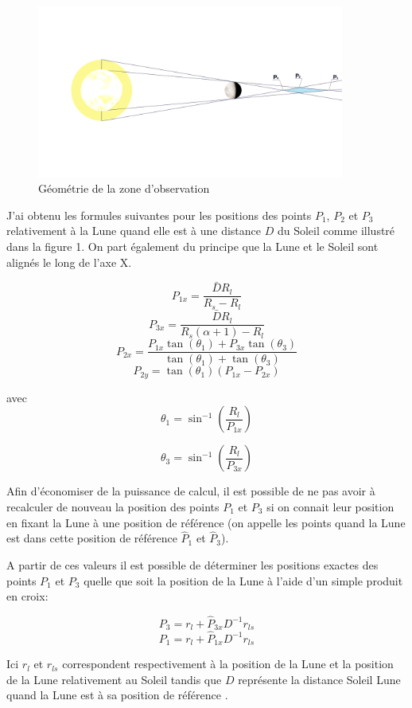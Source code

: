 \documentclass[11pt]{article} %
\begin{document}
		\begin{figure}[H]
			\includegraphics[width=0.9\textwidth]{images/moon_schem.png}
			\caption{Géométrie de la zone d'observation}
		\end{figure}
		
		J'ai obtenu les formules suivantes pour les positions des points $P_1$, $P_2$ et $P_3$ relativement à la Lune quand elle est à une distance $D$ du Soleil comme illustré dans la figure 1. On part également du principe que la Lune et le Soleil sont alignés le long de l'axe X.
		
		$$	
		P_{1x}=\frac{\bar{D}R_l}{R_s-R_l}
		$$ 
		$$	
		P_{3x}=\frac{\bar{D}R_l}{R_s(\alpha+1)-R_l}
		$$
		$$
		P_{2x}=\frac{P_{1x}\tan(\theta_1) + P_{3x}\tan(\theta_3)}{\tan(\theta_1) + \tan(\theta_3)}
		$$
		$$
		P_{2y}=\tan(\theta_1)(P_{1x}-P_{2x})
		$$
		
		avec
		$$
		\theta_1=\sin^{-1}\left(\frac{R_l}{P_{1x}}\right)
		$$
		
		$$
		\theta_3=\sin^{-1}\left(\frac{R_l}{P_{3x}}\right)
		$$
		
		Afin d'économiser de la puissance de calcul, il est possible de ne pas avoir à recalculer de nouveau la position des points $P_1$ et $P_3$ si on connait leur position en fixant la Lune à une position de référence (on appelle les points quand la Lune est dans cette position de référence $\hat{P}_1$ et $\hat{P}_3$). 
		
		A partir de ces valeurs il est possible de déterminer les positions exactes des points $P_1$ et $P_3$ quelle que soit la position de la Lune à l'aide d'un simple produit en croix:
		
		$$
			P_3=r_{l}+\hat{P}_{3x}D^{-1}r_{ls} 
		$$
		$$
			P_1=r_{l}+\hat{P}_{1x}D^{-1}r_{ls}
		$$
		
		Ici $r_{l}$ et $r_{ls}$ correspondent respectivement à la position de la Lune et la position de la Lune relativement au Soleil tandis que $D$ représente la distance Soleil Lune quand la Lune est à sa position de référence .
		
\end{document}
